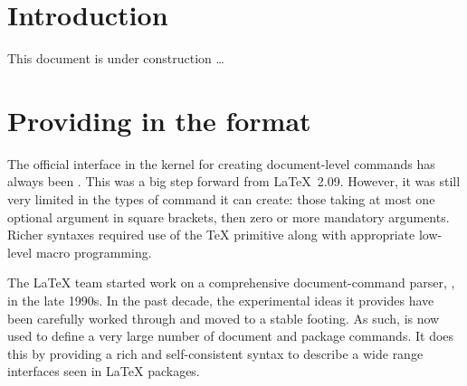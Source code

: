\documentclass{ltnews}
\begin{document}

\maketitle
{ \spaceskip=3.33pt  \tableofcontents}

\setlength{}


\medskip


\section{Introduction}

This document is under construction \ldots



\section{Providing  in the format}

The official interface in the \LaTeXe{} kernel for creating
document-level commands has always been . This was a
big step forward from \LaTeX~2.09. However, it was still very limited
in the types of command it can create: those taking at most one
optional argument in square brackets, then zero or more mandatory
arguments. Richer syntaxes required use of the \TeX{} 
primitive along with appropriate low-level macro programming.

The \LaTeX{} team started work on a comprehensive document-command
parser, , in the late 1990s. In the past decade, the
experimental ideas it provides have been carefully worked through and
moved to a stable footing. As such,  is now used to define
a very large number of document and package commands. It does this by
providing a rich and self-consistent syntax to describe a wide range
interfaces seen in \LaTeX{} packages.
\end{document}
